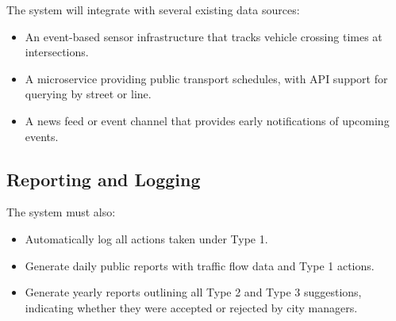 The system will integrate with several existing data sources:
\begin{itemize}
    \item An event-based sensor infrastructure that tracks vehicle crossing times at intersections.
    \item A microservice providing public transport schedules, with API support for querying by street or line.
    \item A news feed or event channel that provides early notifications of upcoming events.
\end{itemize}

\subsection{Reporting and Logging}

The system must also:
\begin{itemize}
    \item Automatically log all actions taken under Type 1.
    \item Generate daily public reports with traffic flow data and Type 1 actions.
    \item Generate yearly reports outlining all Type 2 and Type 3 suggestions, indicating whether they were accepted or rejected by city managers.
\end{itemize}
